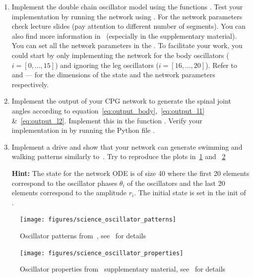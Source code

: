 \documentclass{cmc}
\begin{document}
\begin{enumerate}
\item Implement the double chain oscillator model using the functions
  . Test your implementation by running the
  network using . For the network parameters check
  lecture slides (pay attention to different number of segments). You can also
  find more information in~\cite{ijspeert2007swimming} (especially in the
  supplementary material). You can set all the network parameters in the
  . To facilitate your work, you
  could start by only implementing the network for the body oscillators
  ($i=[0, \ldots, 15]$) and ignoring the leg oscillators ($i=[16, \ldots, 20]$). Refer
  to  and
  --- for the dimensions of
  the state and the network parameters respectively.

\item Implement the output of your CPG network to generate the spinal joint
  angles according to equation~\ref{eq:output_body},~\ref{eq:output_l1} \&~\ref{eq:output_l2}.
  Implement this in the function
  . Verify your implementation in by running
  the Python file .


\item Implement a drive and show that your network can generate swimming and
  walking patterns similarly to~\cite{ijspeert2007swimming}. Try to reproduce
  the plots in~\ref{fig:science_oscillator_patterns} and
~\ref{fig:science_oscillator_properties}


  \textbf{Hint:} The state for the network ODE is of size 40 where the first 20
  elements correspond to the oscillator phases $\theta_i$ of the oscillators and
  the last 20 elements correspond to the amplitude $r_i$. The initial state is
  set in the init of .
\end{enumerate}

\begin{figure}[H]
  \centering
  \texttt{[image: figures/science\_oscillator\_patterns]}
  \caption{Oscillator patterns from~\cite{ijspeert2007swimming}, see~\cite{ijspeert2007swimming} for details}\label{fig:science_oscillator_patterns}
\end{figure}

\begin{figure}[H]
  \centering
  \texttt{[image: figures/science\_oscillator\_properties]}
  \caption{Oscillator properties from~\cite{ijspeert2007swimming} supplementary
    material, see~\cite{ijspeert2007swimming} for details}\label{fig:science_oscillator_properties}
\end{figure}
\end{document}
